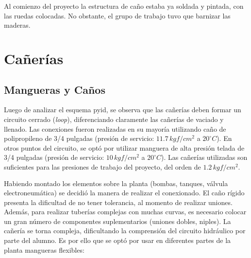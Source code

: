 Al comienzo del proyecto la estructura de caño estaba ya soldada y pintada, con
las ruedas colocadas.
No obstante, el grupo de trabajo tuvo que barnizar las maderas.

\section{Cañerías}
\label{sec:Canerias}

\subsection{Mangueras y Caños}
Luego de analizar el esquema \gls{pyid}, se observa que las cañerías deben
formar un circuito cerrado (\emph{loop}), diferenciando
claramente las cañerías de vaciado y llenado.
Las conexiones fueron realizadas en su mayoría utilizando caño de polipropileno
de 3/4
pulgadas (presión de servicio: $11.7\,kgf/cm^2$ a $20^\circ C$).
En otros puntos del circuito, se optó por utilizar manguera de alta presión
telada de 3/4 pulgadas (presión de servicio: $10\,kgf/cm^2$ a $20^\circ C$).
Las cañerías utilizadas son suficientes para las presiones de trabajo del
proyecto, del orden de $1.2\,kgf/cm^2$.

Habiendo montado los elementos sobre la planta (bombas, tanques, válvula
electroneumática) se decidió la manera de realizar el conexionado.
El caño rígido presenta la dificultad de no tener tolerancia, al momento de
realizar uniones.
Además, para realizar tuberías complejas con muchas curvas, es necesario
colocar un gran número de componentes suplementarios (uniones dobles,
niples).
La cañería se torna compleja, dificultando la comprensión del circuito
hidráulico por parte del alumno.
Es por ello que se optó por usar en diferentes partes de la planta mangueras
flexibles:

